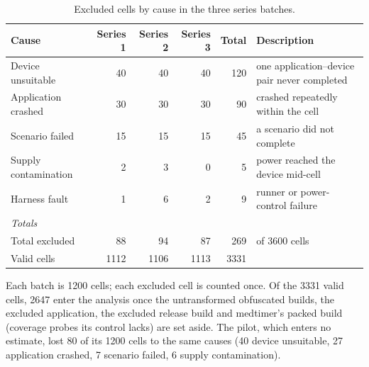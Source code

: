 \begin{table}[t]
\centering
\small
\caption{Excluded cells by cause in the three series batches.}
\label{tab:exclusions}
\begin{tabular}{lrrrrl}
\toprule
\textbf{Cause} & \textbf{Series 1} & \textbf{Series 2} & \textbf{Series 3} & \textbf{Total} & \textbf{Description} \\
\midrule
Device unsuitable & 40 & 40 & 40 & 120 & one application–device pair never completed \\
Application crashed & 30 & 30 & 30 & 90 & crashed repeatedly within the cell \\
Scenario failed & 15 & 15 & 15 & 45 & a scenario did not complete \\
Supply contamination & 2 & 3 & 0 & 5 & power reached the device mid-cell \\
Harness fault & 1 & 6 & 2 & 9 & runner or power-control failure \\
\midrule
\multicolumn{6}{l}{\textit{Totals}} \\
Total excluded & 88 & 94 & 87 & 269 & of 3600 cells \\
Valid cells & 1112 & 1106 & 1113 & 3331 &  \\
\bottomrule
\end{tabular}
\par\smallskip\footnotesize Each batch is 1200 cells; each excluded cell is counted once. Of the 3331 valid cells, 2647 enter the analysis once the untransformed obfuscated builds, the excluded application, the excluded release build and medtimer's packed build (coverage probes its control lacks) are set aside. The pilot, which enters no estimate, lost 80 of its 1200 cells to the same causes (40 device unsuitable, 27 application crashed, 7 scenario failed, 6 supply contamination).
\end{table}
